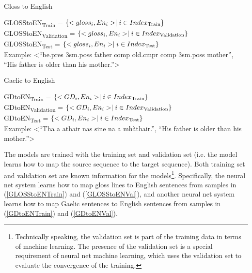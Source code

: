 \documentclass[final]{ua-thesis}
\numberwithin{equation}{section}
\begin{document}
\begin{exe}
	\ex Gloss to English
		\begin{xlist}
		\ex \label{GLOSStoENTrain} GLOSStoEN\textsubscript{Train}   = $\{<gloss_i,En_i>  \mid i \in Index\textsubscript{Train} \}$ \\
		\ex \label{GLOSStoENVal} GLOSStoEN\textsubscript{Validation}   = $\{<gloss_i,En_i>  \mid i \in Index\textsubscript{Validation} \}$ \\
		\ex \label{GLOSStoENTest}GLOSStoEN\textsubscript{Test} = $\{<gloss_i,En_i>  \mid i \in Index\textsubscript{Test} \}$ \\
		\ex  Example: <``be.pres 3sm.poss father comp old.cmpr comp 3sm.poss mother'', ``His father is older than his mother.''>
		\end{xlist}

	
	\ex Gaelic to English
		\begin{xlist}
		\ex \label{GDtoENTrain} GDtoEN\textsubscript{Train}   = $\{<GD_i,En_i>  \mid i \in Index\textsubscript{Train} \}$ \\
		\ex \label{GDtoENVal} GDtoEN\textsubscript{Validation}   = $\{<GD_i,En_i>  \mid i \in Index\textsubscript{Validation} \}$ \\
		\ex \label{GDtoENTest} GDtoEN\textsubscript{Test}    = $\{<GD_i,En_i>  \mid i \in Index\textsubscript{Test} \}$ \\
		\ex Example: <``Tha a athair nas sine na a mh\`athair.'', ``His father is older than his mother.''>
		\end{xlist}
\end{exe}
The models are trained with the training set and validation set (i.e. the model learns how to map the source sequence to the target sequence). Both training set and validation set are known information for the models\footnote{Technically speaking, the validation set is part of the training data in terms of machine learning. The presence of the validation set is a special requirement of neural net machine learning, which uses the validation set to evaluate the convergence of the training.}. Specifically, the neural net system learns how to map gloss lines to English sentences from samples in (\ref{GLOSStoENTrain}) and (\ref{GLOSStoENVal}), and another neural net system learns how to map Gaelic sentences to English sentences from samples in (\ref{GDtoENTrain}) and (\ref{GDtoENVal}).
\end{document}
